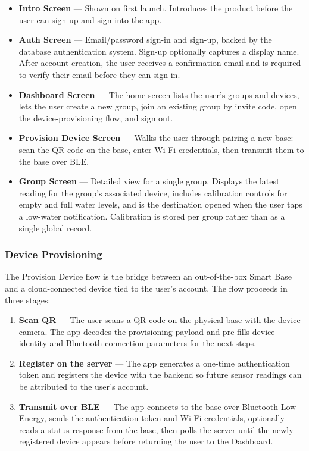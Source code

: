 \begin{itemize}
    \item \textbf{Intro Screen} --- Shown on first launch. Introduces the product before the user can sign up and sign into the app.
    \item \textbf{Auth Screen} --- Email/password sign-in and sign-up, backed by the database authentication system. Sign-up optionally captures a display name. After account creation, the user receives a confirmation email and is required to verify their email before they can sign in.
    \item \textbf{Dashboard Screen} --- The home screen lists the user's groups and devices, lets the user create a new group, join an existing group by invite code, open the device-provisioning flow, and sign out.
    \item \textbf{Provision Device Screen} --- Walks the user through pairing a new base: scan the QR code on the base, enter Wi-Fi credentials, then transmit them to the base over BLE.
    \item \textbf{Group Screen} --- Detailed view for a single group. Displays the latest reading for the group's associated device, includes calibration controls for empty and full water levels, and is the destination opened when the user taps a low-water notification. Calibration is stored per group rather than as a single global record.
\end{itemize}

\subsubsection{Device Provisioning}
The Provision Device flow is the bridge between an out-of-the-box Smart Base and a cloud-connected device tied to the user's account. The flow proceeds in three stages:

\begin{enumerate}
    \item \textbf{Scan QR} --- The user scans a QR code on the physical base with the device camera. The app decodes the provisioning payload and pre-fills device identity and Bluetooth connection parameters for the next steps.
    \item \textbf{Register on the server} --- The app generates a one-time authentication token and registers the device with the backend so future sensor readings can be attributed to the user's account.
    \item \textbf{Transmit over BLE} --- The app connects to the base over Bluetooth Low Energy, sends the authentication token and Wi-Fi credentials, optionally reads a status response from the base, then polls the server until the newly registered device appears before returning the user to the Dashboard.
\end{enumerate}

